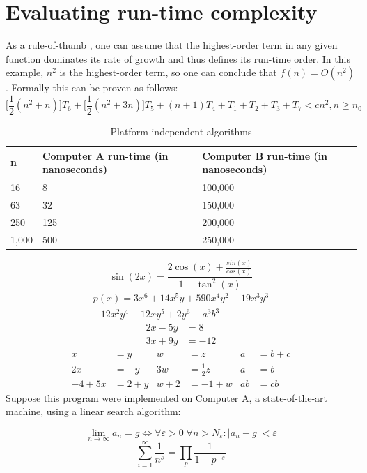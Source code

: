 \documentclass[openany,a4paper,12pt]{book}
\begin{document}
\section{Evaluating run-time complexity}
As a rule-of-thumb \cite{greenwade93}, one can assume that the highest-order term in any given function dominates its rate of growth and thus defines its run-time order. In this example, $n^2$ is the highest-order term, so one can conclude that $f(n) = O(n^2)$. Formally this can be proven as follows:
\begin{equation}
\bigg[\frac{1}{2}(n^2+n)\bigg]T_{6}+\bigg[\frac{1}{2}(n^2+3n)\bigg]T_{5}+(n+1)T_{4}+T_{1}+T_{2}+T_{3}+T_{7}<cn^2, n \geq n_{0}
\end{equation}
\begin{table}[H]
\caption{Platform-independent algorithms} 
\begin{center} 
\begin{tabular}{|l|p{3cm}|p{3cm}|}
\hline \textbf{n} & \textbf{Computer A run-time (in nanoseconds)} & \textbf{Computer B run-time (in nanoseconds)} \\ \hline
16 & 8 & 100,000 \\
63 & 32 & 150,000 \\
250 & 125 & 200,000 \\
1,000 & 500 & 250,000 \\ \hline
\end{tabular}
\end{center}
\end{table}
$$\sin (2x)=\frac{2\cos (x)+\frac{sin (x)}{cos (x)}}{1-\tan^2(x)}$$
\begin{multline*}
p(x) = 3x^6 + 14x^5y + 590x^4y^2 + 19x^3y^3\\ 
- 12x^2y^4 - 12xy^5 + 2y^6 - a^3b^3
\end{multline*}
\begin{align*} 
2x - 5y &=  8 \\ 
3x + 9y &=  -12
\end{align*}
\begin{align*}
x&=y           &  w &=z              &  a&=b+c\\
2x&=-y         &  3w&=\frac{1}{2}z   &  a&=b\\
-4 + 5x&=2+y   &  w+2&=-1+w          &  ab&=cb
\end{align*}
Suppose this program were implemented on Computer A, a state-of-the-art machine, using a linear search algorithm:

\begin{equation}
\lim_{n \to \infty} a_{n} = g \Leftrightarrow
\forall {\varepsilon > 0} \;
\forall {n > N_{\varepsilon}} \colon
\left| {a_{n} - g} \right| < \varepsilon
\end{equation}
\[ \sum_{i=1}^{\infty} \frac{1}{n^s} 
= \prod_p \frac{1}{1 - p^{-s}} \]
\end{document}
